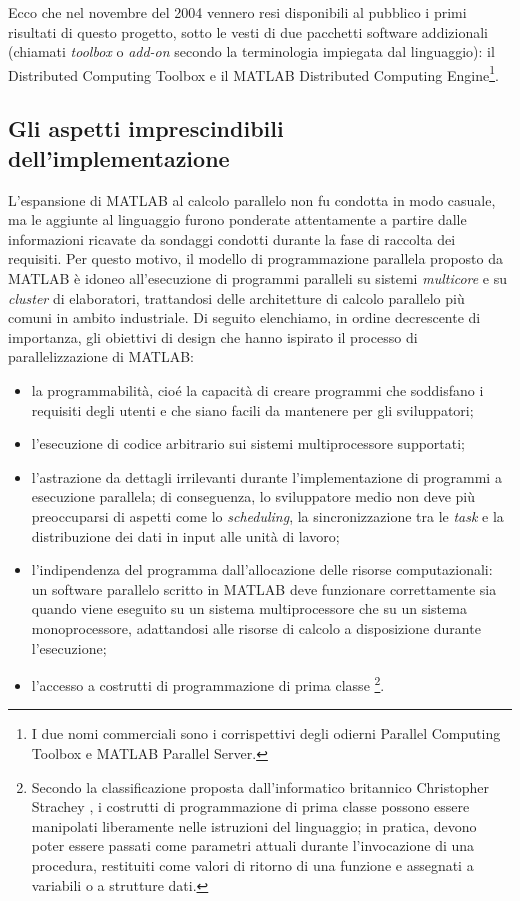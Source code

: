 Ecco che nel novembre del 2004 vennero resi disponibili al pubblico i primi risultati di questo progetto, sotto le vesti di due pacchetti software addizionali (chiamati \textit{toolbox} o \textit{add-on} secondo la terminologia impiegata dal linguaggio): il Distributed Computing 
Toolbox\textsuperscript{\texttrademark} e il MATLAB Distributed Computing Engine\textsuperscript{\texttrademark}\footnote{I due nomi commerciali sono i corrispettivi degli odierni Parallel 
Computing Toolbox\textsuperscript{\texttrademark} e MATLAB Parallel Server\textsuperscript{\texttrademark}.}.

\subsection{Gli aspetti imprescindibili dell'implementazione}
\label{sec2.1.2}
L'espansione di MATLAB al calcolo parallelo non fu condotta in modo casuale, ma le aggiunte al linguaggio furono ponderate attentamente a partire dalle informazioni ricavate da sondaggi condotti durante la fase di raccolta dei requisiti.\newline
Per questo motivo, il modello di programmazione parallela proposto da MATLAB \`e idoneo all'esecuzione di programmi paralleli su sistemi \textit{multicore} e su \textit{cluster} di elaboratori, trattandosi delle architetture di calcolo parallelo pi\`u comuni in ambito industriale.\newline
Di seguito elenchiamo, in ordine decrescente di importanza, gli obiettivi di design che hanno ispirato il processo di parallelizzazione di MATLAB:
\begin{itemize}
    \item la programmabilit\`a, cio\'e la capacit\`a di creare programmi che soddisfano i requisiti degli utenti e che siano facili da mantenere per gli sviluppatori;
    \item l'esecuzione di codice arbitrario sui sistemi multiprocessore supportati;
    \item l'astrazione da dettagli irrilevanti durante l'implementazione di programmi a esecuzione parallela; di conseguenza, lo sviluppatore medio non deve pi\`u preoccuparsi di aspetti come lo \textit{scheduling}, la sincronizzazione tra le \textit{task} e la distribuzione dei dati in input alle unit\`a di lavoro;
    \item l'indipendenza del programma dall'allocazione delle risorse computazionali: un software parallelo scritto in MATLAB deve funzionare correttamente sia quando viene eseguito su un sistema multiprocessore che su un sistema monoprocessore, adattandosi alle risorse di calcolo a disposizione durante l'esecuzione;
    \item l'accesso a costrutti di programmazione di prima classe \footnote{Secondo la classificazione proposta dall'informatico britannico Christopher Strachey \cite{SICP96}, i costrutti di programmazione di prima classe possono essere manipolati liberamente nelle istruzioni del linguaggio; in pratica, devono poter essere passati come parametri attuali durante l'invocazione di una procedura, restituiti come valori di ritorno di una funzione e assegnati a variabili o a strutture dati.}. 
\end{itemize}
